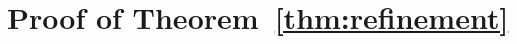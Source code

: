 \documentclass[lettersize,journal]{IEEEtran}
\theoremstyle{definition}
\theoremstyle{definition}
\newtheorem{assumption}{Assumption}
\newtheorem{defn}{Definition}
\newtheorem{rmk}{Remark}
\def\fixme#1#2{\textbf{\color{red}[FIXME (#1): #2]}}
\begin{document}
\section*{Proof of Theorem~\ref{thm:refinement}}





 
 
\end{document}
